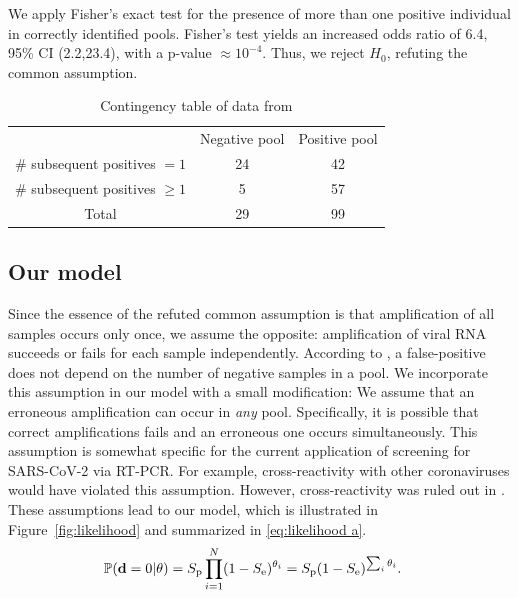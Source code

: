 \documentclass{article}
\begin{document}
We apply Fisher's exact test for the presence of more than one
positive individual in correctly identified pools. Fisher's test
yields an increased odds ratio of 6.4, 95\% CI (2.2,23.4), with a
p-value $\approx 10^{-4}$. Thus, we reject $H_0$, refuting the common
assumption.

\begin{table}[h]
\centering
\begin{tabular}{ c c c }
                                & Negative pool  & Positive pool \\%
\# subsequent positives $=1$    & 24             & 42            \\%
\# subsequent positives $\geq1$ & 5              & 57            \\%
 Total                          & 29             & 99            \\%
\end{tabular}
\caption{Contingency table of data from \cite{Salazar}}\label{table}
\end{table}

\subsection*{Our model}\label{subsec:ours}
Since the essence of the refuted common assumption is that
amplification of all samples occurs only once, we assume the opposite:
amplification of viral RNA succeeds or fails for each sample
independently. According to \cite{Simplistic1, Simplistic2, Kim,
  OptimalDorfmanPool}, a false-positive does not
depend on the number of negative samples in a pool. We incorporate
this assumption in our model with a small modification: We assume that
an erroneous amplification can occur in \emph{any} pool. Specifically,
it is possible that correct amplifications fails and an erroneous one
occurs simultaneously. This assumption is somewhat specific for the
current application of screening for SARS-CoV-2 via RT-PCR. For
example, cross-reactivity with other coronaviruses would have violated
this assumption. However, cross-reactivity was ruled out in
\cite{KitComparison}. These assumptions lead to our model, which is illustrated in 
Figure~\ref{fig:likelihood} and summarized in
\eqref{eq:likelihood a}.
\begin{align}
    \mathbb{P}(\mathbf{d}=0 | \theta) &= S_{\text{p}}\prod_{i=1}^N
    (1-S_{\text{e}})^{\theta_i} = S_{\text{p}}(1-S_\text{e})^{\sum_i\theta_i}. \label{eq:likelihood a}
\end{align}
\end{document}
